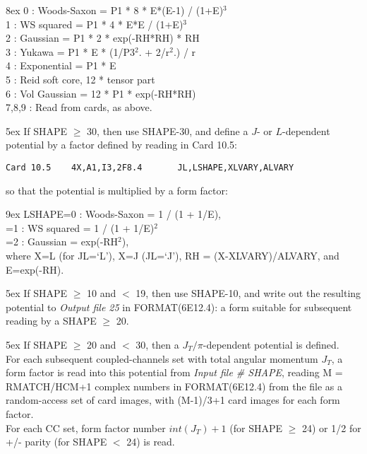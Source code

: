 \documentclass[11pt]{article}
\begin{document}
\hangindent 8ex
      0 : Woods-Saxon  = P1 * 8 * E*(E-1) / (1+E)$^3$\\
      1 : WS squared   = P1 * 4 * E*E / (1+E)$^3$\\
      2 : Gaussian     = P1 * 2 * exp(-RH*RH) * RH\\
      3 : Yukawa       = P1 * E * (1/P3$^2$. + 2/r$^2$.) / r\\
      4 : Exponential  = P1 * E\\
      5 : Reid soft core, 12 * tensor part\\
      6 : Vol Gaussian = 12 * P1 * exp(-RH*RH)\\
      7,8,9 : Read from cards, as above.

\medskip

\hangindent 5ex
If SHAPE $\geq$ 30, then use SHAPE-30, and define a
$J$- or  $L$-dependent potential by a factor defined
by reading in Card 10.5:
\begin{verbatim}
Card 10.5    4X,A1,I3,2F8.4       JL,LSHAPE,XLVARY,ALVARY
\end{verbatim}
so that the potential is multiplied by a form factor:

\hangindent 9ex
LSHAPE=0 : Woods-Saxon  = 1 / (1 + 1/E), \\
      =1 : WS squared   = 1 / (1 + 1/E)$^2$\\
      =2 : Gaussian     = exp(-RH$^2$), \\
where X=L (for JL=`L'), X=J (JL=`J'),
RH = (X-XLVARY)/ALVARY, and E=exp(-RH).

\medskip

\hangindent 5ex
If SHAPE $\geq$ 10 and $<$ 19, then use SHAPE-10, and write out the
resulting potential to {\em Output file 25} in FORMAT(6E12.4):
a form suitable for subsequent reading by a SHAPE $\geq$ 20.

\medskip

\hangindent 5ex
If SHAPE $\geq$ 20 and $<$ 30, then a $J_{T}/\pi$-dependent
potential is defined.
\\
For each subsequent coupled-channels set with total angular momentum
$J_{T}$, a form factor is read into this potential from
{\em Input file \# SHAPE}, reading M = RMATCH/HCM+1 complex numbers
in FORMAT(6E12.4) from the
file as a random-access set of card images, with (M-1)/3+1 card images
for each form factor.
\\
For each CC set, form factor number
$int(J_{T})+1$ (for SHAPE $\geq$ 24) or
1/2 for +/- parity (for SHAPE $<$ 24) is read.
\end{document}
